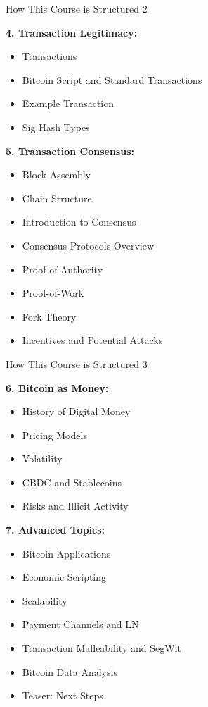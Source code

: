 \documentclass[handout]{beamer}
\begin{document}
\begin{frame}{How This Course is Structured 2}
\footnotesize	

\textbf{4. Transaction Legitimacy:}
	\begin{itemize}
		\item Transactions
		\item Bitcoin Script and Standard Transactions
		\item Example Transaction
		\item Sig Hash Types
	\end{itemize}	

\vspace{0.5em}

\textbf{5. Transaction Consensus:}
	\begin{itemize}
		\item Block Assembly
		\item Chain Structure
		\item Introduction to Consensus
		\item Consensus Protocols Overview
		\item Proof-of-Authority
		\item Proof-of-Work
		\item Fork Theory
		\item Incentives and Potential Attacks
	\end{itemize}	

\end{frame}


\begin{frame}{How This Course is Structured 3}
\footnotesize	

\textbf{6. Bitcoin as Money:}
	\begin{itemize}
		\item History of Digital Money
		\item Pricing Models
		\item Volatility
		\item CBDC and Stablecoins
		\item Risks and Illicit Activity
	\end{itemize}	

\vspace{0.5em}

\textbf{7. Advanced Topics:}
	\begin{itemize}
		\item Bitcoin Applications
		\item Economic Scripting
		\item Scalability
		\item Payment Channels and LN
		\item Transaction Malleability and SegWit
		\item Bitcoin Data Analysis
		\item Teaser: Next Steps
	\end{itemize}	

\end{frame}
\end{document}
